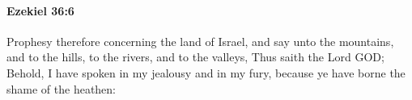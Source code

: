 
		\paragraph{Ezekiel 36:6} %
			\label{EZEKIEL-36-6}

			Prophesy therefore concerning the land of Israel, and say unto the mountains, and to the hills, to the rivers, and to the valleys, Thus saith the Lord GOD; Behold, I have spoken in my jealousy and in my fury, because ye have borne the shame of the heathen:


